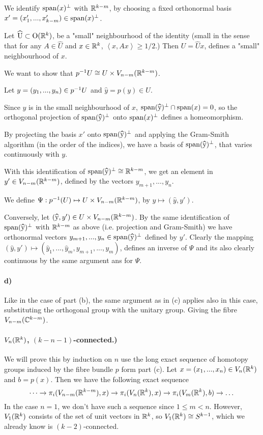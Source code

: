 \documentclass[a4paper,11pt,english]{article}
\newcommand{\orth}{\bot}
\begin{document}
\begin{exercise}[1]
We identify $\span(x)^\orth$ with $\mathbb{R}^{k-m}$, by choosing a fixed orthonormal
basis $x' = (x'_1, ..., x'_{k-m}) \in \span(x)^\orth$.

Let $\hat U \subset \O(\R^k)$, be a "small" neighbourhood of the identity (small
in the sense that for any $A \in \hat U$ and $x \in \mathbb{R}^k$, $\left<x, Ax\right>
\ge 1/2$.) Then $U = \hat Ux$, defines a "small" neighbourhood of $x$.

We want to show that $p^{-1} U \cong U \times V_{n-m}(\mathbb{R}^{k-m})$. 

Let $y = (y_1, ..., y_n) \in p^{-1} U$ and $\hat y = p(y) \in U$. 

Since $\hat y$ is in the small neighbourhood of $x$, $\span(\hat y)^\orth \cap
\span(x) = 0$, so the orthogonal projection of $\span(\hat y)^\orth$ onto
$\span(x)^\orth$ defines a homeomorphism. 

By projecting the basis $x'$ onto $\span(\hat y)^\orth$ and applying the
Gram-Smith algorithm (in the order of the indices), we have a basis 
of $\span(\hat y)^\orth$, that varies continuously with $y$. 

With this identification of $\span(\hat y)^\orth \cong \R^{k-m}$, we get an
element in $y' \in V_{n-m}(\mathbb{R}^{k-m})$, defined by the vectors $y_{m+1}, ..., y_n$.

We define $\Psi : p^{-1}(U) \mapsto U \times V_{n-m}(\mathbb{R}^{k-m})$, by $y \mapsto
(\hat y, y')$.

Conversely, let $(\hat y, y') \in U \times V_{n-m}(\R^{k-m})$. By the same
identification of $\span(\hat y)^\orth$ with $\mathbb{R}^{k-m}$ as above (i.e. projection
and Gram-Smith) we have orthonormal vectors $y_{m+1}, ..., y_n \in \span(\hat
y)^\orth$ defined by $y'$. Clearly the mapping $(\hat y, y') \mapsto (\hat y_1,
..., \hat y_m, y_{m+1}, ..., y_m)$, defines an inverse of $\Psi$ and its also
clearly continuous by the same argument ans for $\Psi$.

\paragraph{d)}
Like in the case of part (b), the same argument as in (c) applies also in this
case, substituting the orthogonal group with the unitary group. Giving the fibre
$V_{n-m}(\mathbb{C}^{k-m})$.


\paragraph{$V_n(\mathbb{R}^k)$, $(k-n-1)$-connected.)}
We will prove this by induction on $n$ use the long exact sequence of homotopy
groups induced by the fibre bundle $p$ form part (c). Let $x = (x_1,...,x_n) \in
V_n(\mathbb{R}^k)$ and $b = p(x)$. Then we have the following exact sequence
\[ \dots \to \pi_i(V_{n-m}(\mathbb{R}^{k-m}), x) \to \pi_i(V_n(\mathbb{R}^k), x) \to  \pi_i(V_m(\mathbb{R}^k),
b) \to \dots \]
In the case $n = 1$, we don't have such a sequence since $1 \le m < n$. However, 
$V_1(\mathbb{R}^k)$ consists of the set of unit vectors in $\mathbb{R}^k$, so $V_1(\mathbb{R}^k) \cong
S^{k-1}$, which we already know is $(k-2)$-connected.


\end{exercise}
\end{document}
